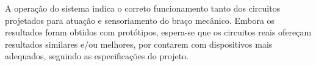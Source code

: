 A operação do sistema indica o correto funcionamento tanto dos circuitos projetados para atuação e
sensoriamento do braço mecânico. Embora os resultados foram obtidos com protótipos, espera-se que 
os circuitos reais ofereçam resultados similares e/ou melhores, por contarem com dispositivos mais
adequados, seguindo as especificações do projeto.